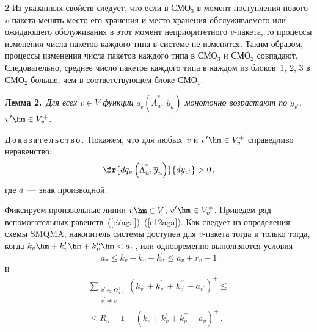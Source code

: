 \begin{multicols}{2}
     Из указанных свойств следует, что если в СМО$_3$ в момент 
поступления нового $v$-пакета менять мес\-то его хранения и место хранения 
обслуживаемого или ожидающего обслуживания в этот момент 
неприоритетного $v$-пакета, то процессы изменения числа пакетов каждого 
типа в системе не изменятся. Таким образом, процессы изменения числа 
пакетов каждого типа в СМО$_3$ и СМО$_2$ совпадают. Следовательно, 
среднее число пакетов каждого типа в каждом из блоков~1, 2, 3 в СМО$_2$ 
больше, чем в соответствующем блоке СМО$_1$. 
     
     \medskip
     
     \noindent
     \textbf{Лемма 2.}\ \textit{Для всех $v\in V$ функции 
$q_v(\overline{\Lambda}_u^*,\,\overline{y}_u)$ монотонно возрастают по} 
$y_{v^\prime}$, $v^\prime\hm\in V_v^+$.
     
     \medskip
     
     \noindent
     Д\,о\,к\,а\,з\,а\,т\,е\,л\,ь\,с\,т\,в\,о\,.\ Покажем, что для любых~$v$ и 
$v^\prime\hm\in V_v^+$ справедливо неравенство:
     \begin{equation}
     \fr{dq_v\left(\overline{\Lambda}_u^*, \overline{y}_u 
\right)}{dy_{v^\prime}}>0\,,
     \label{e6aga}
     \end{equation}
где $d$~--- знак производной. 
     
     Фиксируем произвольные линии $v\hm\in V$, $v^\prime\hm\in V_v^+$. 
Приведем ряд вспомогательных равенств~(\ref{e7aga})--(\ref{e12aga}). Как 
следует из определения схемы SMQMA, накопитель системы доступен для 
     $v$-пакета тогда и только тогда, когда 
$k_v\hm+k_v^\prime\hm+k_v^{\prime\prime}\hm<a_v$, или одновременно 
выполняются условия 
$$
a_v\leq  k_v+k_v^\prime+k_v^{\prime\prime}\leq a_v+r_v-1
$$ 
и 
\begin{multline*}
\sum\limits_{\substack{{v^\prime\in\Omega_u^+,}\\{v^\prime\not=v}}}\left( 
k_{v^\prime}+k^\prime_{v^\prime}+k_{v^\prime}^{\prime\prime} - 
a_{v^\prime}\right)^+\leq{}\\
{}\leq R_u-1-
\left(k_v+k_v^\prime+k_v^{\prime\prime}-a_v\right)^+\,.
\end{multline*}
     

\end{multicols}
